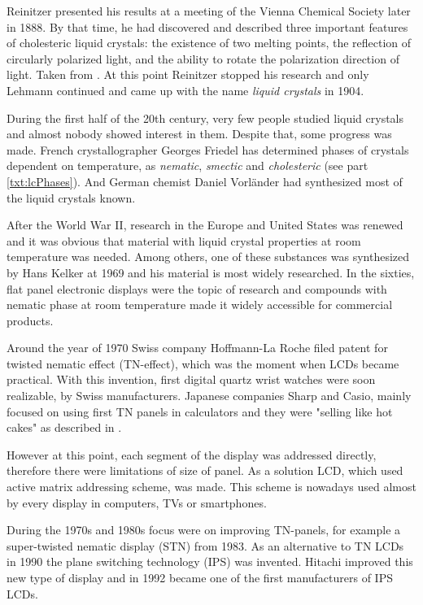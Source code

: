 Reinitzer presented his results at a meeting of the Vienna Chemical Society later in 1888. By that time, he had discovered and described three important features of cholesteric liquid crystals: the existence of two melting points, the reflection of circularly polarized light, and the ability to rotate the polarization direction of light. Taken from \cite{wikihistory}. At this point Reinitzer stopped his research and only Lehmann continued and came up with the name \emph{liquid crystals} in 1904.

During the first half of the 20th century, very few people studied liquid crystals and almost nobody showed interest in them. Despite that, some progress was made. French crystallographer Georges Friedel has determined phases of crystals dependent on temperature, as \emph{nematic}, \emph{smectic} and \emph{cholesteric} (see part \ref{txt:lcPhases}). And German chemist Daniel Vorländer had synthesized most of the liquid crystals known.

After the World War II, research in the Europe and United States was renewed and it was obvious that material with liquid crystal properties at room temperature was needed. Among others, one of these substances was synthesized by Hans Kelker at 1969 and his material is most widely researched. In the sixties, flat panel electronic displays were the topic of research and compounds with nematic phase at room temperature made it widely accessible for commercial products.

Around the year of 1970 Swiss company Hoffmann-La Roche filed patent for twisted nematic effect (TN-effect), which was the moment when LCDs became practical. With this invention, first digital quartz wrist watches were soon realizable, by Swiss manufacturers. Japanese companies Sharp and Casio, mainly focused on using first TN panels in calculators and they were "selling like hot cakes" as described in \cite{kawamoto2002history}.

However at this point, each segment of the display was addressed directly, therefore there were limitations of size of panel. As a solution LCD, which used active matrix addressing scheme, was made. This scheme is nowadays used almost by every display in computers, TVs or smartphones.

During the 1970s and 1980s focus were on improving TN-panels, for example a super-twisted nematic display (STN) from 1983. As an alternative to TN LCDs in 1990 the plane switching technology (IPS) was invented. Hitachi improved this new type of display and in 1992 became one of the first manufacturers of IPS LCDs.

